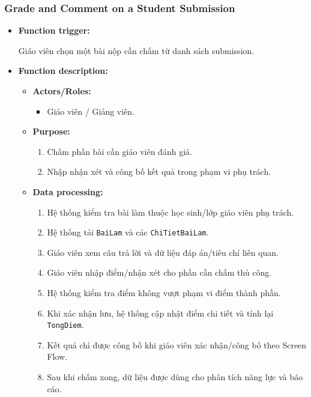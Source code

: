 \documentclass[12pt,a4paper,oneside]{report}
\begin{document}
\subsubsection{Grade and Comment on a Student Submission}
\label{subsubsec:grade-comment-submission}

\begin{itemize}

    \item \textbf{Function trigger:}

    Giáo viên chọn một bài nộp cần chấm từ danh sách submission.

    \item \textbf{Function description:}

    \begin{itemize}

        \item \textbf{Actors/Roles:}
        \begin{itemize}
            \item Giáo viên / Giảng viên.
        \end{itemize}

        \item \textbf{Purpose:}
        \begin{enumerate}
            \item Chấm phần bài cần giáo viên đánh giá.
            \item Nhập nhận xét và công bố kết quả trong phạm vi phụ trách.
        \end{enumerate}

        \item \textbf{Data processing:}
        \begin{enumerate}
            \item Hệ thống kiểm tra bài làm thuộc học sinh/lớp giáo viên phụ trách.
            \item Hệ thống tải \texttt{BaiLam} và các \texttt{ChiTietBaiLam}.
            \item Giáo viên xem câu trả lời và dữ liệu đáp án/tiêu chí liên quan.
            \item Giáo viên nhập điểm/nhận xét cho phần cần chấm thủ công.
            \item Hệ thống kiểm tra điểm không vượt phạm vi điểm thành phần.
            \item Khi xác nhận lưu, hệ thống cập nhật điểm chi tiết và tính lại \texttt{TongDiem}.
            \item Kết quả chỉ được công bố khi giáo viên xác nhận/công bố theo Screen Flow.
            \item Sau khi chấm xong, dữ liệu được dùng cho phân tích năng lực và báo cáo.
        \end{enumerate}


\end{itemize}
\end{itemize}
\end{document}
